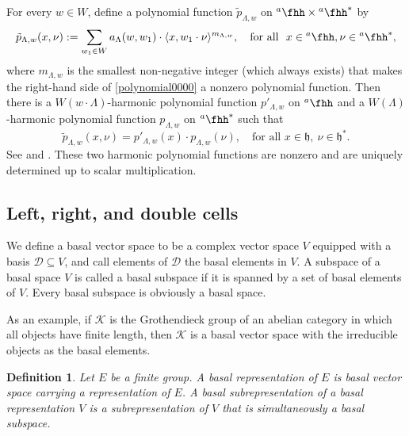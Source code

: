 \documentclass[12pt,a4paper]{amsart}
\def\subset{\subseteq}
\newcommand{\CK}{{\mathcal {K}}}
\newcommand{\h}{\mathfrak h}
\newcommand{\la}{\langle}
\newcommand{\ra}{\rangle}
\newcommand{\be}{\begin {equation}}
\newcommand{\ee}{\end {equation}}
\numberwithin{equation}{section}
\newtheorem{defn}[thm]{Definition}
\theoremstyle{remark}
\def\hha{{}^a\fhh}
\begin{document}
For every $w\in W$, define a polynomial function $\tilde p_{\Lambda, w}$ on $\hha\times \hha^*$ by
\be\label{polynomial0000}
  \tilde p_{\Lambda, w}(x,\nu):= \sum_{w_1\in W} a_{\Lambda}(w, w_1)\cdot  \la x, w_1\cdot \nu\ra^{m_{\Lambda, w}},\quad  \textrm{for all }  \ x\in \hha, \nu\in \hha^*,
\ee
where $m_{\Lambda, w}$ is the smallest non-negative integer (which always exists) that makes the right-hand side of \eqref{polynomial0000} a nonzero polynomial function.
Then there is a $W(w\cdot\Lambda)$-harmonic polynomial function $p'_{\Lambda, w}$ on $\hha$ and a  $W(\Lambda)$-harmonic polynomial function $p_{\Lambda, w}$ on $\hha^*$ such that
\[
  \tilde  p_{\Lambda,  w}(x,\nu)= p'_{\Lambda,w}(x)\cdot  p_{\Lambda,w}(\nu), \quad\textrm{for all }  x\in \h,  \ \nu\in \h^*.
\]
See \cite{King} and \cite[Section 5.1]{J.hw}. These two harmonic polynomial functions are nonzero and are uniquely determined up to scalar multiplication.



\subsection{Left, right, and double cells}\label{seccell}

We define a basal vector space to be a complex vector space $V$ equipped with a basis $\mathcal D\subset V$, and call elements of $\mathcal D$ the basal elements in $V$. A subspace of a basal space $V$ is called a basal subspace if it is spanned by a set of basal elements of $V$. Every basal subspace is obviously a basal space.

As an example, if $\CK$ is the Grothendieck group of an abelian category in which all objects have finite length, then $\CK$ is a basal vector space with the irreducible objects as the basal elements.





\begin{defn}
Let $E$ be a  finite group. A basal representation of $E$ is basal vector space carrying a representation of $E$. A basal subrepresentation of a basal representation $V$ is a subrepresentation of $V$ that is simultaneously a basal subspace.
\end{defn}
\end{document}
